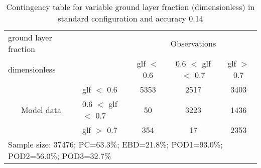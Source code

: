 \begin{table}[]
\begin{center}
\begin{tabular}{llccc}
\hline
{ground layer fraction}                                       &                                                    & \multicolumn{3}{c}{Observations}                 \\
{dimensionless}                                       &                             & glf $<$ 0.6   & 0.6 $<$ glf $<$ 0.7 & glf $>$ 0.7 \\
\hline
\multicolumn{1}{c}{\multirow{3}{*}{Model data}}  & glf $<$ 0.6             & 5353                & 2517                       & 3403              \\
                                                 & 0.6  $<$ glf $<$ 0.7 & 50                & 3223                       & 1436              \\
                                                 & glf $>$ 0.7             & 354                & 17                       & 2353              \\
\hline
\multicolumn{5}{l}{Sample size: 37476; PC=63.3\%; EBD=21.8\%; POD1=93.0\%; POD2=56.0\%; POD3=32.7\%}
\end{tabular}
\end{center}
\caption{Contingency table for variable ground layer fraction (dimensionless) in standard configuration and accuracy 0.14}
\label{tab:contingencyglfBEF}
\end{table}

